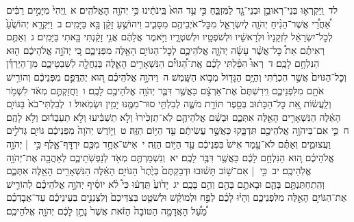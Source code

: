 \documentclass[18pt]{article}
\newcommand{\vart}[1]{\Bfootnote{#1}}	%
\begin{document}
 {\loc לד~}וַֽיִּקְרְא֛וּ בְּנֵי־רְאוּבֵ֥ן וּבְנֵי־גָ֖ד לַמִּזְבֵּ֑חַ כִּ֣י עֵ֥ד הוּא֙ בֵּֽינֹתֵ֔ינוּ כִּ֥י יְהֹוָ֖ה הָאֱלֹהִֽים׃ 
\startlock
 {\loc א~}וַֽיְהִי֙ מִיָּמִ֣ים רַבִּ֔ים אַ֠חֲרֵ֠י אֲשֶׁר־הֵנִ֨יחַ יְהֹוָ֧ה לְיִשְׂרָאֵ֛ל מִכׇּל־אֹיְבֵיהֶ֖ם מִסָּבִ֑יב וִיהוֹשֻׁ֣עַ זָקֵ֔ן בָּ֖א בַּיָּמִֽים׃ \startlock
 {\loc ב~}וַיִּקְרָ֤א יְהוֹשֻׁ֙עַ֙ לְכׇל־יִשְׂרָאֵ֔ל לִזְקֵנָיו֙ וּלְרָאשָׁ֔יו וּלְשֹׁפְטָ֖יו וּלְשֹׁטְרָ֑יו וַיֹּ֣אמֶר אֲלֵהֶ֔ם אֲנִ֣י זָקַ֔נְתִּי בָּ֖אתִי בַּיָּמִֽים׃ \startlock
 {\loc ג~}וְאַתֶּ֣ם רְאִיתֶ֗ם אֵת֩ כׇּל־אֲשֶׁ֨ר עָשָׂ֜ה יְהֹוָ֧ה אֱלֹהֵיכֶ֛ם לְכׇל־הַגּוֹיִ֥ם הָאֵ֖לֶּה מִפְּנֵיכֶ֑ם כִּ֚י יְהֹוָ֣ה אֱלֹהֵיכֶ֔ם ה֖וּא הַנִּלְחָ֥ם לָכֶֽם׃ \startlock
 {\loc ד~}רְאוּ֩ הִפַּ֨לְתִּי לָכֶ֜ם אֶֽת־הַ֠גּוֹיִ֠ם הַנִּשְׁאָרִ֥ים הָאֵ֛לֶּה בְּנַחֲלָ֖ה לְשִׁבְטֵיכֶ֑ם מִן־הַיַּרְדֵּ֗ן וְכׇל־הַגּוֹיִם֙ אֲשֶׁ֣ר הִכְרַ֔תִּי וְהַיָּ֥ם הַגָּד֖וֹל מְב֥וֹא הַשָּֽׁמֶשׁ׃ \startlock
 {\loc ה~}וַיהֹוָ֣ה אֱלֹהֵיכֶ֗ם ה֚וּא יֶהְדֳּפֵ֣ם מִפְּנֵיכֶ֔ם וְהוֹרִ֥ישׁ אֹתָ֖ם מִלִּפְנֵיכֶ֑ם וִֽירִשְׁתֶּם֙ אֶת־אַרְצָ֔ם כַּאֲשֶׁ֥ר דִּבֶּ֛ר יְהֹוָ֥ה אֱלֹהֵיכֶ֖ם לָכֶֽם׃ \startlock
 {\loc ו~}וַחֲזַקְתֶּ֣ם מְאֹ֔ד לִשְׁמֹ֣ר וְלַֽעֲשׂ֔וֹת אֵ֚ת כׇּל־הַכָּת֔וּב בְּסֵ֖פֶר תּוֹרַ֣ת מֹשֶׁ֑ה לְבִלְתִּ֥י סוּר־מִמֶּ֖נּוּ יָמִ֥ין וּשְׂמֹֽאול׃ \startlock
 {\loc ז~}לְבִלְתִּי־בֹא֙ בַּגּוֹיִ֣ם הָאֵ֔לֶּה הַנִּשְׁאָרִ֥ים הָאֵ֖לֶּה אִתְּכֶ֑ם וּבְשֵׁ֨ם אֱלֹהֵיהֶ֤ם לֹֽא־תַזְכִּ֙ירוּ֙ וְלֹ֣א תַשְׁבִּ֔יעוּ וְלֹ֣א תַעַבְד֔וּם וְלֹ֥א  \edtext{תִֽשְׁתַּחֲו֖וּ}{\vart{א=תִֽשְׁתַּחֲוּ֖וּ | }}  לָהֶֽם׃ \startlock
 {\loc ח~}כִּ֛י אִם־בַּיהֹוָ֥ה אֱלֹהֵיכֶ֖ם תִּדְבָּ֑קוּ כַּאֲשֶׁ֣ר עֲשִׂיתֶ֔ם עַ֖ד הַיּ֥וֹם הַזֶּֽה׃ \startlock
 {\loc ט~}וַיּ֤וֹרֶשׁ יְהֹוָה֙ מִפְּנֵיכֶ֔ם גּוֹיִ֖ם גְּדֹלִ֣ים וַעֲצוּמִ֑ים וְאַתֶּ֗ם לֹא־עָ֤מַד אִישׁ֙ בִּפְנֵיכֶ֔ם עַ֖ד הַיּ֥וֹם הַזֶּֽה׃ \startlock
 {\loc י~}אִישׁ־אֶחָ֥ד מִכֶּ֖ם יִרְדׇּף־אָ֑לֶף כִּ֣י  |  יְהֹוָ֣ה אֱלֹהֵיכֶ֗ם ה֚וּא הַנִּלְחָ֣ם לָכֶ֔ם כַּאֲשֶׁ֖ר דִּבֶּ֥ר לָכֶֽם׃ \startlock
 {\loc יא~}וְנִשְׁמַרְתֶּ֥ם מְאֹ֖ד לְנַפְשֹֽׁתֵיכֶ֑ם לְאַהֲבָ֖ה אֶת־יְהֹוָ֥ה אֱלֹֽהֵיכֶֽם׃ \startlock
 {\loc יב~}כִּ֣י  |  אִם־שׁ֣וֹב תָּשׁ֗וּבוּ וּדְבַקְתֶּם֙ בְּיֶ֙תֶר֙ הַגּוֹיִ֣ם הָאֵ֔לֶּה הַנִּשְׁאָרִ֥ים הָאֵ֖לֶּה אִתְּכֶ֑ם וְהִֽתְחַתַּנְתֶּ֥ם בָּהֶ֛ם וּבָאתֶ֥ם בָּהֶ֖ם וְהֵ֥ם בָּכֶֽם׃ \startlock
 {\loc יג~}יָד֙וֹעַ֙ תֵּֽדְע֔וּ כִּי֩ לֹ֨א יוֹסִ֜יף יְהֹוָ֣ה אֱלֹהֵיכֶ֗ם לְהוֹרִ֛ישׁ אֶת־הַגּוֹיִ֥ם הָאֵ֖לֶּה מִלִּפְנֵיכֶ֑ם וְהָי֨וּ לָכֶ֜ם לְפַ֣ח וּלְמוֹקֵ֗שׁ וּלְשֹׁטֵ֤ט בְּצִדֵּיכֶם֙ וְלִצְנִנִ֣ים בְּעֵינֵיכֶ֔ם עַד־אֲבׇדְכֶ֗ם מֵ֠עַ֠ל הָאֲדָמָ֤ה הַטּוֹבָה֙ הַזֹּ֔את אֲשֶׁר֙ נָתַ֣ן לָכֶ֔ם יְהֹוָ֖ה אֱלֹהֵיכֶֽם׃ \startlock
\end{document}
